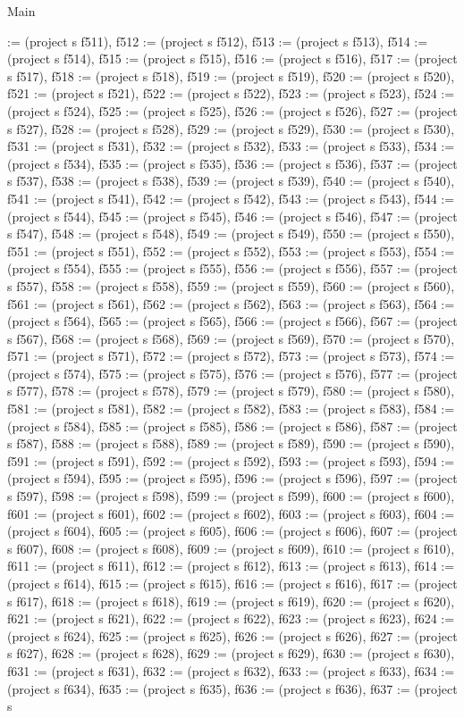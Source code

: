 \begin{lexlean}{Main}
\begin{semanticmodule}
{:= (project s f511), f512 := (project s f512), f513 := (project s f513), f514 := (project s f514), f515 := (project s f515), f516 := (project s f516), f517 := (project s f517), f518 := (project s f518), f519 := (project s f519), f520 := (project s f520), f521 := (project s f521), f522 := (project s f522), f523 := (project s f523), f524 := (project s f524), f525 := (project s f525), f526 := (project s f526), f527 := (project s f527), f528 := (project s f528), f529 := (project s f529), f530 := (project s f530), f531 := (project s f531), f532 := (project s f532), f533 := (project s f533), f534 := (project s f534), f535 := (project s f535), f536 := (project s f536), f537 := (project s f537), f538 := (project s f538), f539 := (project s f539), f540 := (project s f540), f541 := (project s f541), f542 := (project s f542), f543 := (project s f543), f544 := (project s f544), f545 := (project s f545), f546 := (project s f546), f547 := (project s f547), f548 := (project s f548), f549 := (project s f549), f550 := (project s f550), f551 := (project s f551), f552 := (project s f552), f553 := (project s f553), f554 := (project s f554), f555 := (project s f555), f556 := (project s f556), f557 := (project s f557), f558 := (project s f558), f559 := (project s f559), f560 := (project s f560), f561 := (project s f561), f562 := (project s f562), f563 := (project s f563), f564 := (project s f564), f565 := (project s f565), f566 := (project s f566), f567 := (project s f567), f568 := (project s f568), f569 := (project s f569), f570 := (project s f570), f571 := (project s f571), f572 := (project s f572), f573 := (project s f573), f574 := (project s f574), f575 := (project s f575), f576 := (project s f576), f577 := (project s f577), f578 := (project s f578), f579 := (project s f579), f580 := (project s f580), f581 := (project s f581), f582 := (project s f582), f583 := (project s f583), f584 := (project s f584), f585 := (project s f585), f586 := (project s f586), f587 := (project s f587), f588 := (project s f588), f589 := (project s f589), f590 := (project s f590), f591 := (project s f591), f592 := (project s f592), f593 := (project s f593), f594 := (project s f594), f595 := (project s f595), f596 := (project s f596), f597 := (project s f597), f598 := (project s f598), f599 := (project s f599), f600 := (project s f600), f601 := (project s f601), f602 := (project s f602), f603 := (project s f603), f604 := (project s f604), f605 := (project s f605), f606 := (project s f606), f607 := (project s f607), f608 := (project s f608), f609 := (project s f609), f610 := (project s f610), f611 := (project s f611), f612 := (project s f612), f613 := (project s f613), f614 := (project s f614), f615 := (project s f615), f616 := (project s f616), f617 := (project s f617), f618 := (project s f618), f619 := (project s f619), f620 := (project s f620), f621 := (project s f621), f622 := (project s f622), f623 := (project s f623), f624 := (project s f624), f625 := (project s f625), f626 := (project s f626), f627 := (project s f627), f628 := (project s f628), f629 := (project s f629), f630 := (project s f630), f631 := (project s f631), f632 := (project s f632), f633 := (project s f633), f634 := (project s f634), f635 := (project s f635), f636 := (project s f636), f637 := (project s }
\end{semanticmodule}
\end{lexlean}
